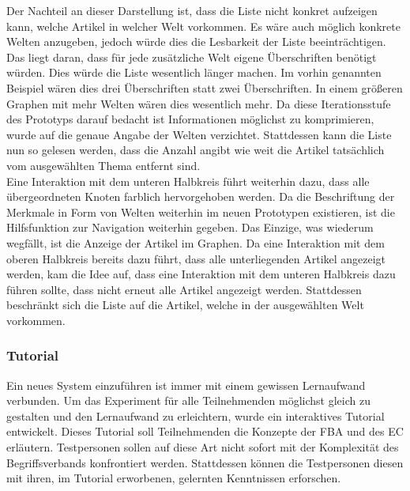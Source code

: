 Der Nachteil an dieser Darstellung ist, dass die Liste nicht konkret aufzeigen kann, welche Artikel in welcher Welt vorkommen.
Es wäre auch möglich konkrete Welten anzugeben, jedoch würde dies die Lesbarkeit der Liste beeinträchtigen.
Das liegt daran, dass für jede zusätzliche Welt eigene Überschriften benötigt würden.
Dies würde die Liste wesentlich länger machen.
Im vorhin genannten Beispiel wären dies drei Überschriften statt zwei Überschriften.
In einem größeren Graphen mit mehr Welten wären dies wesentlich mehr.
Da diese Iterationsstufe des Prototyps darauf bedacht ist Informationen möglichst zu komprimieren, wurde auf die genaue Angabe der Welten verzichtet.
Stattdessen kann die Liste nun so gelesen werden, dass die Anzahl angibt wie weit die Artikel tatsächlich vom ausgewählten Thema entfernt sind.\\

Eine Interaktion mit dem unteren Halbkreis führt weiterhin dazu, dass alle übergeordneten Knoten farblich hervorgehoben werden.
Da die Beschriftung der Merkmale in Form von Welten weiterhin im neuen Prototypen existieren, ist die Hilfsfunktion zur Navigation weiterhin gegeben.
Das Einzige, was wiederum wegfällt, ist die Anzeige der Artikel im Graphen.
Da eine Interaktion mit dem oberen Halbkreis bereits dazu führt, dass alle unterliegenden Artikel angezeigt werden, kam die Idee auf, dass eine Interaktion mit dem unteren Halbkreis dazu führen sollte, dass nicht erneut alle Artikel angezeigt werden.
Stattdessen beschränkt sich die Liste auf die Artikel, welche in der ausgewählten Welt vorkommen. \\

\subsubsection{Tutorial}
Ein neues System einzuführen ist immer mit einem gewissen Lernaufwand verbunden.
Um das Experiment für alle Teilnehmenden möglichst gleich zu gestalten und den Lernaufwand zu erleichtern, wurde ein interaktives Tutorial entwickelt.
Dieses Tutorial soll Teilnehmenden die Konzepte der \ac{FBA} und des \ac{EC} erläutern.
Testpersonen sollen auf diese Art nicht sofort mit der Komplexität des Begriffsverbands konfrontiert werden.
Stattdessen können die Testpersonen diesen mit ihren, im Tutorial erworbenen, gelernten Kenntnissen erforschen.\\


